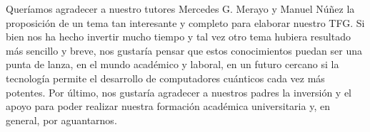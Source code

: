 Queríamos agradecer a nuestro tutores Mercedes G. Merayo y Manuel Núñez la proposición de un tema tan interesante y completo para elaborar nuestro TFG. Si bien nos ha hecho invertir mucho tiempo y tal vez otro tema hubiera resultado más sencillo y breve, nos gustaría pensar que estos conocimientos  puedan ser una punta de lanza, en el mundo académico y laboral, en un futuro cercano si la tecnología permite el desarrollo de computadores cuánticos cada vez más potentes. Por último, nos gustaría agradecer a nuestros padres la inversión y el apoyo para poder realizar nuestra formación académica universitaria y, en general, por aguantarnos.